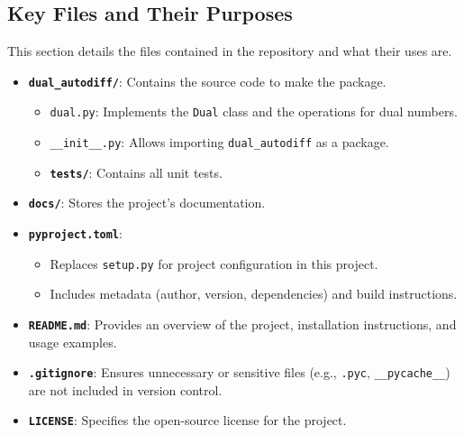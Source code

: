\documentclass[12.5pt]{article}
\begin{document}
\subsection{Key Files and Their Purposes} 
This section details the files contained in the repository and what their uses are.
\begin{itemize}
    \item \textbf{\texttt{dual\_autodiff/}}: Contains the source code to make the package.
    \begin{itemize}
        \item \texttt{dual.py}: Implements the \texttt{Dual} class and the operations for dual numbers.
        \item \texttt{\_\_init\_\_.py}: Allows importing \texttt{dual\_autodiff} as a package.
        \item \textbf{\texttt{tests/}}: Contains all unit tests.
    \end{itemize}
    \item \textbf{\texttt{docs/}}: Stores the project's documentation.
    \item \textbf{\texttt{pyproject.toml}}:
    \begin{itemize}
        \item Replaces \texttt{setup.py} for project configuration in this project.
        \item Includes metadata (author, version, dependencies) and build instructions.
    \end{itemize}
    \item \textbf{\texttt{README.md}}: Provides an overview of the project, installation instructions, and usage examples.
    \item \textbf{\texttt{.gitignore}}: Ensures unnecessary or sensitive files (e.g., \texttt{.pyc}, \texttt{\_\_pycache\_\_}) are not included in version control.
    \item \textbf{\texttt{LICENSE}}: Specifies the open-source license for the project.
\end{itemize}
\end{document}

